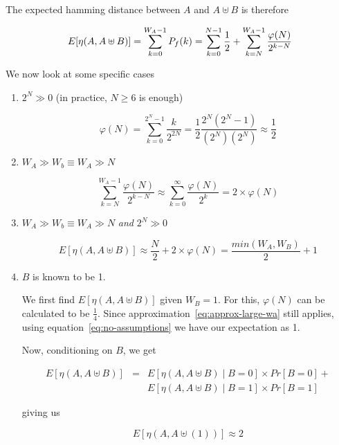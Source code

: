 The expected hamming distance between $A$ and $A \uplus B$ is therefore

\begin{equation}
  \label{eq:no-assumptions}
  E[\eta(A, A \uplus B)]
  = \displaystyle\sum\limits_{k=0}^{W_A - 1} P_f(k) \\
  = \displaystyle\sum\limits_{k=0}^{N - 1} \frac{1}{2} + 
  \displaystyle\sum\limits_{k=N}^{W_A - 1} \frac{\varphi(N)}{2^{k - N}}
\end{equation}

We now look at some specific cases

\begin{enumerate}
  \item $2^N \gg 0$ (in practice, $N \geq 6$ is enough)

    \begin{equation}
      \varphi(N) = \displaystyle\sum\limits_{k=0}^{2^{N} - 1} \frac{k}{2^{2 N}} = 
      \frac{1}{2} \frac{2^N (2^N - 1)}{(2^N) (2^N)}
      \approx \frac{1}{2}
    \end{equation}

  \item $W_A \gg W_b \equiv W_A \gg N$

    \begin{equation}
      \label{eq:approx-large-wa}
      \displaystyle\sum\limits_{k=N}^{W_A - 1} \frac{\varphi(N)}{2^{k - N}} \approx
      \displaystyle\sum\limits_{k=0}^{\infty} \frac{\varphi(N)}{2^k} = 2 \times \varphi(N)
    \end{equation}

  \item $W_A \gg W_b \equiv W_A \gg N$ \textit{and} $2^N \gg 0$

    \begin{equation}
      E[\eta(A, A \uplus B)] \approx \frac{N}{2} + 2 \times \varphi(N) = 
      \frac{min(W_A, W_B)}{2} + 1
    \end{equation}

  \item $B$ is known to be 1.

    We first find $E[\eta(A, A \uplus B)]$ given $W_B = 1$.  For this,
    $\varphi(N)$ can be calculated to be $\frac{1}{4}$.  Since
    approximation~\ref{eq:approx-large-wa} still applies, using
    equation~\ref{eq:no-assumptions} we have our expectation as 1.

    Now, conditioning on $B$, we get

    \begin{eqnarray*}
      E[\eta(A, A \uplus B)] & = & E[\eta(A, A \uplus B) \mid B = 0]
      \times Pr[B = 0] + \\
      && E[\eta(A, A \uplus B) \mid B = 1] \times Pr[B
        = 1]
    \end{eqnarray*}

    giving us

    \begin{equation}
      \label{eq:average-flips}
      E[\eta(A, A \uplus (1))] \approx 2
    \end{equation}

\end{enumerate}

